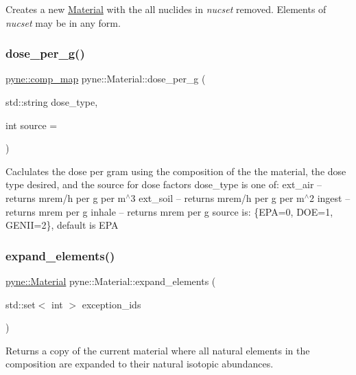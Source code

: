 Creates a new \hyperlink{classpyne_1_1_material}{Material} with the all nuclides in {\itshape nucset} removed. Elements of {\itshape nucset} may be in any form. \mbox{\label{classpyne_1_1_material_a8a55933dccd966f7f3e29d21043bb0d5}} 
\subsubsection{\texorpdfstring{dose\+\_\+per\+\_\+g()}{dose\_per\_g()}}
{\footnotesize\ttfamily \hyperlink{namespacepyne_a86738cecccf4ce3f4ecc2ff6f45ce1a2}{pyne\+::comp\+\_\+map} pyne\+::\+Material\+::dose\+\_\+per\+\_\+g (\begin{DoxyParamCaption}\item[{std\+::string}]{dose\+\_\+type,  }\item[{int}]{source = {} }\end{DoxyParamCaption})}

Caclulates the dose per gram using the composition of the the material, the dose type desired, and the source for dose factors dose\+\_\+type is one of\+: ext\+\_\+air -- returns mrem/h per g per m$^\wedge$3 ext\+\_\+soil -- returns mrem/h per g per m$^\wedge$2 ingest -- returns mrem per g inhale -- returns mrem per g source is\+: \{E\+PA=0, D\+OE=1, G\+E\+N\+II=2\}, default is E\+PA \mbox{\label{classpyne_1_1_material_a4c35931980a7a455f214c6b23c664f45}} 
\subsubsection{\texorpdfstring{expand\+\_\+elements()}{expand\_elements()}}
{\footnotesize\ttfamily \hyperlink{classpyne_1_1_material}{pyne\+::\+Material} pyne\+::\+Material\+::expand\+\_\+elements (\begin{DoxyParamCaption}\item[{std\+::set$<$ int $>$}]{exception\+\_\+ids }\end{DoxyParamCaption})}

Returns a copy of the current material where all natural elements in the composition are expanded to their natural isotopic abundances. \mbox{\label{classpyne_1_1_material_a6bcd10072abbf3e9a8bcaa466f8be569}} 
